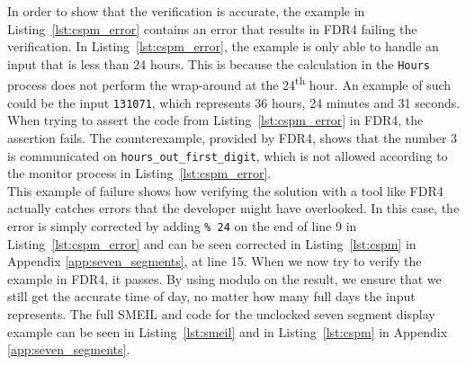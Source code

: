 In order to show that the verification is accurate, the example in Listing~\ref{lst:cspm_error} contains an error that results in FDR4 failing the verification. In Listing~\ref{lst:cspm_error}, the example is only able to handle an input that is less than 24 hours. This is because the calculation in the \texttt{Hours} process does not perform the wrap-around at the 24\textsuperscript{th} hour. An example of such could be the input \texttt{131071}, which represents 36 hours, 24 minutes and 31 seconds. When trying to assert the code from Listing~\ref{lst:cspm_error} in FDR4, the assertion fails. The counterexample, provided by FDR4, shows that the number 3 is communicated on \texttt{hours\_out\_first\_digit}, which is not allowed according to the monitor process in Listing~\ref{lst:cspm_error}.\\

This example of failure shows how verifying the solution with a tool like FDR4 actually catches errors that the developer might have overlooked. In this case, the error is simply corrected by adding \texttt{\% 24} on the end of line 9 in Listing~\ref{lst:cspm_error} and can be seen corrected in Listing~\ref{lst:cspm} in Appendix \ref{app:seven_segments}, at line 15. When we now try to verify the example in FDR4, it passes. By using modulo on the result, we ensure that we still get the accurate time of day, no matter how many full days the input represents.
The full SMEIL and \cspm{} code for the unclocked seven segment display example can be seen in Listing~\ref{lst:smeil} and in Listing~\ref{lst:cspm} in Appendix \ref{app:seven_segments}.

